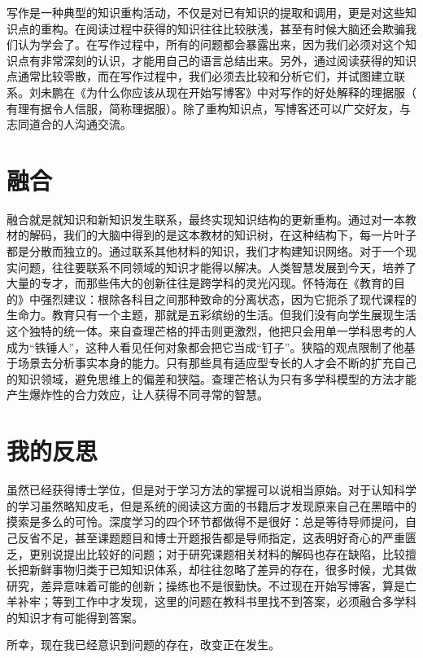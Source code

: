 \documentclass[10pt,a4paper,UTF8]{article}
\begin{document}
写作是一种典型的知识重构活动，不仅是对已有知识的提取和调用，更是对这些知识点的重构。在阅读过程中获得的知识往往比较肤浅，甚至有时候大脑还会欺骗我们认为学会了。在写作过程中，所有的问题都会暴露出来，因为我们必须对这个知识点有非常深刻的认识，才能用自己的语言总结出来。另外，通过阅读获得的知识点通常比较零散，而在写作过程中，我们必须去比较和分析它们，并试图建立联系。刘未鹏在《为什么你应该从现在开始写博客》中对写作的好处解释的理据服（ 有理有据令人信服，简称理据服）。除了重构知识点，写博客还可以广交好友，与志同道合的人沟通交流。

\section{融合}
\label{sec:orgheadline6}


融合就是就知识和新知识发生联系，最终实现知识结构的更新重构。通过对一本教材的解码，我们的大脑中得到的是这本教材的知识树，在这种结构下，每一片叶子都是分散而独立的。通过联系其他材料的知识，我们才构建知识网络。对于一个现实问题，往往要联系不同领域的知识才能得以解决。人类智慧发展到今天，培养了大量的专才，而那些伟大的创新往往是跨学科的灵光闪现。怀特海在《教育的目的》中强烈建议：根除各科目之间那种致命的分离状态，因为它扼杀了现代课程的生命力。教育只有一个主题，那就是五彩缤纷的生活。但我们没有向学生展现生活这个独特的统一体。来自查理芒格的抨击则更激烈，他把只会用单一学科思考的人成为“铁锤人”，这种人看见任何对象都会把它当成“钉子”。狭隘的观点限制了他基于场景去分析事实本身的能力。只有那些具有适应型专长的人才会不断的扩充自己的知识领域，避免思维上的偏差和狭隘。查理芒格认为只有多学科模型的方法才能产生爆炸性的合力效应，让人获得不同寻常的智慧。

\section{我的反思}
\label{sec:orgheadline7}


虽然已经获得博士学位，但是对于学习方法的掌握可以说相当原始。对于认知科学的学习虽然略知皮毛，但是系统的阅读这方面的书籍后才发现原来自己在黑暗中的摸索是多么的可怜。深度学习的四个环节都做得不是很好：总是等待导师提问，自己反省不足，甚至课题题目和博士开题报告都是导师指定，这表明好奇心的严重匮乏，更别说提出比较好的问题；对于研究课题相关材料的解码也存在缺陷，比较擅长把新鲜事物归类于已知知识体系，却往往忽略了差异的存在，很多时候，尤其做研究，差异意味着可能的创新；操练也不是很勤快。不过现在开始写博客，算是亡羊补牢；等到工作中才发现，这里的问题在教科书里找不到答案，必须融合多学科的知识才有可能得到答案。

所幸，现在我已经意识到问题的存在，改变正在发生。
\end{document}
